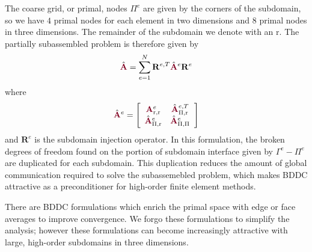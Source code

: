 The coarse grid, or primal, nodes $\Pi^e$ are given by the corners of the subdomain, so we have $4$ primal nodes for each element in two dimensions and $8$ primal nodes in three dimensions.
The remainder of the subdomain we denote with an $\text{r}$.
The partially subassembled problem is therefore given by
\begin{equation}
\hat{\color{burgundy}\mathbf{A}} = \sum_{e = 1}^N \mathbf{R}^{e, T} \hat{\color{burgundy}\mathbf{A}}^e \mathbf{R}^e
\label{eq:subassembled}
\end{equation}
where
\begin{equation}
\hat{\color{burgundy}\mathbf{A}}^e =
\left[ \begin{array}{c c}
{\color{burgundy}\mathbf{A}}_{\text{r}, \text{r}}^e  &  \hat{\color{burgundy}\mathbf{A}}_{\Pi, \text{r}}^{e, T}  \\
\hat{\color{burgundy}\mathbf{A}}_{\Pi, \text{r}}^e   &  \hat{\color{burgundy}\mathbf{A}}_{\Pi, \Pi}^e            \\
\end{array} \right]
\end{equation}
and $\mathbf{R}^e$ is the subdomain injection operator. 
In this formulation, the broken degrees of freedom found on the portion of subdomain interface given by $\Gamma^e - \Pi^e$ are duplicated for each subdomain.
This duplication reduces the amount of global communication required to solve the subassemebled problem, which makes BDDC attractive as a preconditioner for high-order finite element methods.

There are BDDC formulations which enrich the primal space with edge or face averages to improve convergence.
We forgo these formulations to simplify the analysis; however these formulations can become increasingly attractive with large, high-order subdomains in three dimensions.

